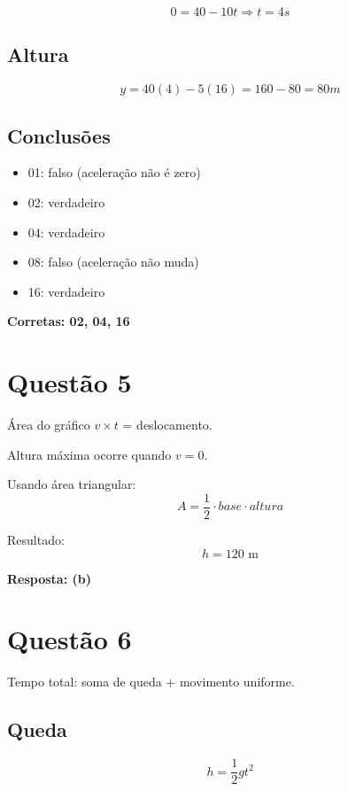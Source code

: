 \documentclass[a4paper,12pt]{article}
\begin{document}
\begin{equation}
0 = 40 - 10t \Rightarrow t = 4s
\end{equation}

\subsection*{Altura}
\begin{equation}
y = 40(4) - 5(16) = 160 - 80 = 80m
\end{equation}

\subsection*{Conclusões}
\begin{itemize}
\item 01: falso (aceleração não é zero)
\item 02: verdadeiro
\item 04: verdadeiro
\item 08: falso (aceleração não muda)
\item 16: verdadeiro
\end{itemize}

\textbf{Corretas: 02, 04, 16}

\newpage

\section*{Questão 5}

Área do gráfico $v \times t$ = deslocamento.

Altura máxima ocorre quando $v=0$.

Usando área triangular:
\begin{equation}
A = \frac{1}{2} \cdot base \cdot altura
\end{equation}

Resultado:
\begin{equation}
h = 120 \text{ m}
\end{equation}

\textbf{Resposta: (b)}

\newpage

\section*{Questão 6}

Tempo total: soma de queda + movimento uniforme.

\subsection*{Queda}
\begin{equation}
h = \frac{1}{2}gt^2
\end{equation}
\end{document}
